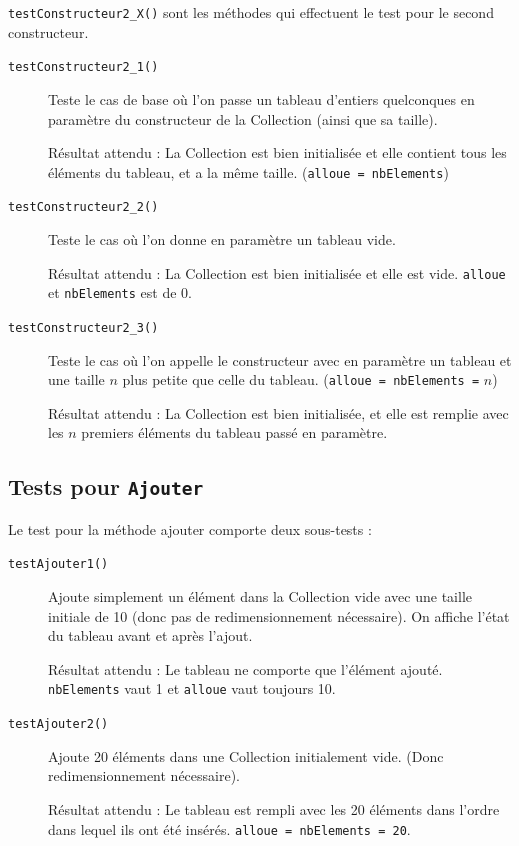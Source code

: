 \documentclass[11pt]{article}
\begin{document}
\texttt{testConstructeur2\_X()} sont les méthodes qui effectuent le test pour le second constructeur. 
\begin{description}
	\item[\texttt{testConstructeur2\_1()}] Teste le cas de base où l'on passe un tableau d'entiers quelconques en paramètre du constructeur de la Collection (ainsi que sa taille).
	
	Résultat attendu : La Collection est bien initialisée et elle contient tous les éléments du tableau, et a la même taille. ({\tt alloue = nbElements})
	
	\item[\texttt{testConstructeur2\_2()}] Teste le cas où l'on donne en paramètre un tableau vide.
	
	Résultat attendu : La Collection est bien initialisée et elle est vide. \texttt{alloue} et \texttt{nbElements} est de 0. 
	
	\item[\texttt{testConstructeur2\_3()}] Teste le cas où l'on appelle le constructeur avec en paramètre un tableau et une taille $n$ plus petite que celle du tableau. ({\tt alloue = nbElements =} $n$)
	
	Résultat attendu : La Collection est bien initialisée, et elle est remplie avec les $n$ premiers éléments du tableau passé en paramètre.
\end{description}

\subsection{Tests pour \tt Ajouter}
Le test pour la méthode ajouter comporte deux sous-tests :

\begin{description}

	\item[\texttt{testAjouter1()}] Ajoute simplement un élément dans la Collection vide avec une taille initiale de 10 (donc pas de redimensionnement nécessaire). On affiche l'état du tableau avant et après l'ajout.
	
	Résultat attendu : Le tableau ne comporte que l'élément ajouté. \texttt{nbElements} vaut 1 et \texttt{alloue} vaut toujours 10. 
	
	\item[\texttt{testAjouter2()}] Ajoute 20 éléments dans une Collection initialement vide. (Donc redimensionnement nécessaire).
	
	Résultat attendu : Le tableau est rempli avec les 20 éléments dans l'ordre dans lequel ils ont été insérés. \texttt{alloue = nbElements = 20}.
	
\end{description}
\end{document}
